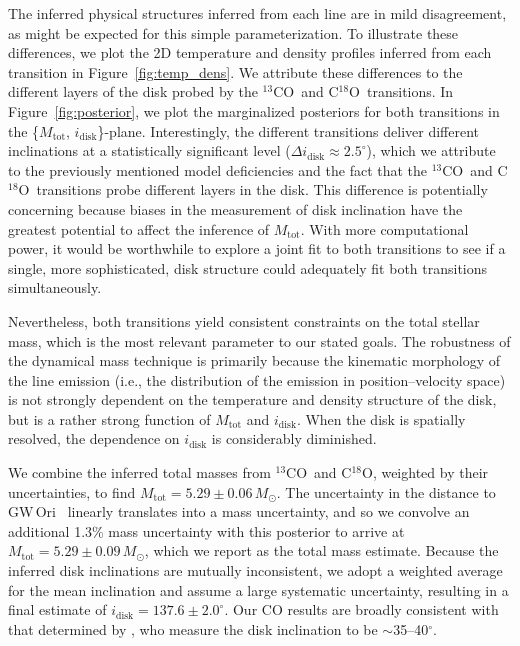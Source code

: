 \documentclass[twocolumn]{aastex61}
\newcommand{\obj}{GW\,Ori}
\newcommand{\thirteen}{${}^{13}$CO}
\newcommand{\eighteen}{C${}^{18}$O}
\begin{document}
The inferred physical structures inferred from each line are in mild disagreement, as might be expected for this simple parameterization. To illustrate these differences, we plot the 2D temperature and density profiles inferred from each transition in Figure~\ref{fig:temp_dens}. We attribute these differences to the different layers of the disk probed by the \thirteen\ and \eighteen\ transitions. In Figure~\ref{fig:posterior}, we plot the marginalized posteriors for both transitions in the \{$M_\mathrm{tot}$, $i_\mathrm{disk}$\}-plane. Interestingly, the different transitions deliver different inclinations at a statistically significant level ($\Delta i_\mathrm{disk} \approx 2.5^\circ$), which we attribute to the previously mentioned model deficiencies and the fact that the \thirteen\ and \eighteen\ transitions probe different layers in the disk. This difference is potentially concerning because biases in the measurement of disk inclination have the greatest potential to affect the inference of $M_\mathrm{tot}$. With more computational power, it would be worthwhile to explore a joint fit to both transitions to see if a single, more sophisticated, disk structure could adequately fit both transitions simultaneously.

Nevertheless, both transitions yield consistent constraints on the total stellar mass, which is the most relevant parameter to our stated goals. The robustness of the dynamical mass technique is primarily because the kinematic morphology of the line emission (i.e., the distribution of the emission in position--velocity space) is not strongly dependent on the temperature and density structure of the disk, but is a rather strong function of $M_\mathrm{tot}$ and $i_\mathrm{disk}$. When the disk is spatially resolved, the dependence on $i_\mathrm{disk}$ is considerably diminished. 

We combine the inferred total masses from \thirteen\ and \eighteen, weighted by their uncertainties, to find $M_\mathrm{tot} = 5.29 \pm 0.06\,M_\odot$. The uncertainty in the distance to \obj\ \citep[$388 \pm 5\,$pc;][]{kounkel17} linearly translates into a mass uncertainty, and so we convolve an additional 1.3\% mass uncertainty with this posterior to arrive at $M_\mathrm{tot} = 5.29 \pm 0.09\,M_\odot$, which we report as the total mass estimate. Because the inferred disk inclinations are mutually inconsistent, we adopt a weighted average for the mean inclination and assume a large systematic uncertainty, resulting in a final estimate of $i_\mathrm{disk} = 137.6 \pm 2.0^\circ$. Our CO results are broadly consistent with that determined by \citet{fang17}, who measure the disk inclination to be $\sim$35--40$^\circ$.
\end{document}
